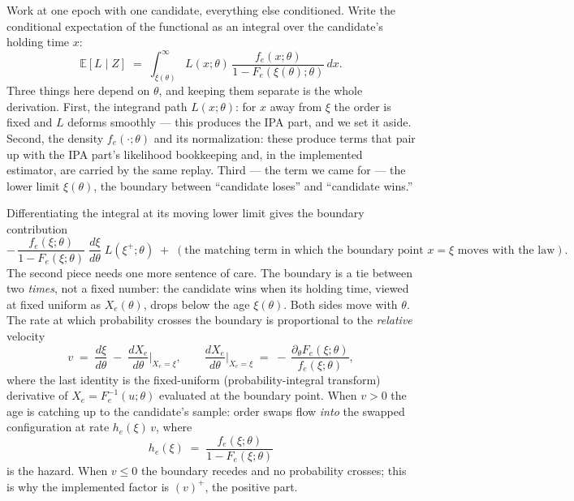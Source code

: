 \documentclass[11pt]{article}
\newcommand{\E}{\mathbb{E}}
\begin{document}
Work at one epoch with one candidate, everything else conditioned. Write
the conditional expectation of the functional as an integral over the
candidate's holding time $x$:
\[
\E[L \mid Z]
\;=\;
\int_{\xi(\theta)}^{\infty}
L(x;\theta)\,
\frac{f_e(x;\theta)}{1 - F_e(\xi(\theta);\theta)}
\,dx .
\]
Three things here depend on $\theta$, and keeping them separate is the
whole derivation. First, the integrand path $L(x;\theta)$: for $x$ away
from $\xi$ the order is fixed and $L$ deforms smoothly --- this produces
the IPA part, and we set it aside. Second, the density $f_e(\cdot;\theta)$
and its normalization: these produce terms that pair up with the IPA
part's likelihood bookkeeping and, in the implemented estimator, are
carried by the same replay. Third --- the term we came for --- the lower
limit $\xi(\theta)$, the boundary between ``candidate loses'' and
``candidate wins.''

Differentiating the integral at its moving lower limit gives the boundary
contribution
\[
-\,\frac{f_e(\xi;\theta)}{1 - F_e(\xi;\theta)}\;
\frac{d\xi}{d\theta}\;
L(\xi^+;\theta)
\;+\;
(\text{the matching term in which the boundary point } x = \xi
\text{ moves with the law}) .
\]
The second piece needs one more sentence of care. The boundary is a tie
between two \emph{times}, not a fixed number: the candidate wins when its
holding time, viewed at fixed uniform as $X_e(\theta)$, drops below the
age $\xi(\theta)$. Both sides move with $\theta$. The rate at which
probability crosses the boundary is proportional to the \emph{relative}
velocity
\[
v \;=\; \frac{d\xi}{d\theta} \;-\; \frac{dX_e}{d\theta}\Big|_{X_e = \xi},
\qquad
\frac{dX_e}{d\theta}\Big|_{X_e=\xi}
\;=\;
-\,\frac{\partial_\theta F_e(\xi;\theta)}{f_e(\xi;\theta)} ,
\]
where the last identity is the fixed-uniform (probability-integral
transform) derivative of $X_e = F_e^{-1}(u;\theta)$ evaluated at the
boundary point. When $v > 0$ the age is catching up to the candidate's
sample: order swaps flow \emph{into} the swapped configuration at rate
$h_e(\xi)\,v$, where
\[
h_e(\xi) \;=\; \frac{f_e(\xi;\theta)}{1 - F_e(\xi;\theta)}
\]
is the hazard. When $v \le 0$ the boundary recedes and no probability
crosses; this is why the implemented factor is $(v)^+$, the positive
part.
\end{document}
